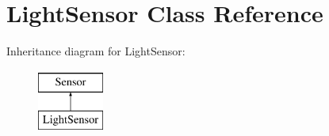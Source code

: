 \hypertarget{class_light_sensor}{}\section{Light\+Sensor Class Reference}
\label{class_light_sensor}
Inheritance diagram for Light\+Sensor\+:\begin{figure}[H]
\begin{center}
\leavevmode
\includegraphics[height=2.000000cm]{class_light_sensor}
\end{center}
\end{figure}
